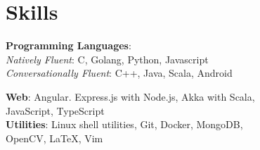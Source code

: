\section*{\sc Skills}
\vspace{-2mm}
\hrulefill
\vspace{2mm}

\textbf{Programming Languages}:\\
\quad \textit{Natively Fluent}: C, Golang, Python, Javascript\\
\quad \textit{Conversationally Fluent}: C++, Java, Scala, Android

\textbf{Web}:
Angular. Express.js with Node.js, Akka with Scala,\\
\quad JavaScript, TypeScript\\

\textbf{Utilities}:
Linux shell utilities, Git, Docker, MongoDB,\\
\quad OpenCV, \LaTeX, Vim

